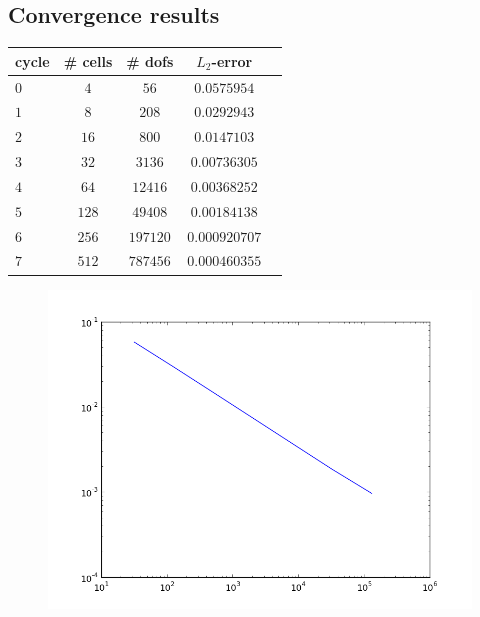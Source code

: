 \documentclass[14pt]{extarticle}
\numberwithin{equation}{section}    %
\begin{document}
\subsection{Convergence results}

\begin{table}[H]
\begin{center}
\begin{tabular}{|l|c|c|c|c|}
\hline
cycle & \# cells & \# dofs & $L_2$-error\\
\hline
$0$ & $4$ & $56$ & $0.0575954$\\
            $1$ & $8$ & $208$ & $0.0292943$\\
            $2$ & $16$ & $800$ & $0.0147103$\\
            $3$ & $32$ & $3136$ & $0.00736305$\\
            $4$ & $64$ & $12416$ & $0.00368252$\\
            $5$ & $128$ & $49408$ & $0.00184138$\\
            $6$ & $256$ & $197120$ & $0.000920707$\\
            $7$ & $512$ & $787456$ & $0.000460355$\\

\hline
\end{tabular}
\end{center}
\end{table}

\begin{figure}[h!]
\centering
\includegraphics[width=15cm]{FEniCS_ConvergencePlot}
\end{figure}
\end{document}
